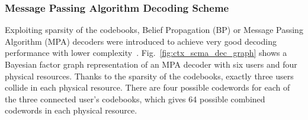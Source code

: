 \subsubsection{Message Passing Algorithm Decoding Scheme}
\label{sec:ctx_scma_detection}





Exploiting sparsity of the codebooks, Belief Propagation (BP) or Message Passing
Algorithm (MPA) decoders were introduced to achieve very good decoding
performance with lower complexity~\cite{Zhang2014a}.
Fig.~\ref{fig:ctx_scma_dec_graph} shows a Bayesian factor graph representation
of an MPA decoder with six users and four physical resources. Thanks to the
sparsity of the codebooks, exactly three users collide in each physical
resource. There are four possible codewords for each of the three connected
user's codebooks, which gives 64 possible combined codewords in each physical
resource.

